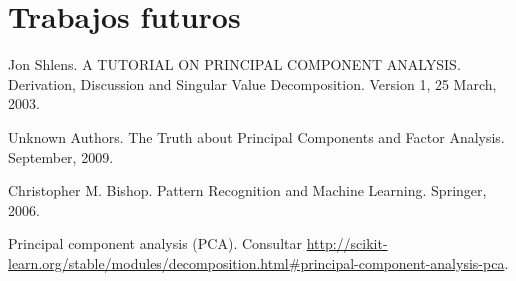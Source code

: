 \documentclass[11pt,spanish,listoffigures,listoftables]{tfgetsinf}
\begin{document}
\chapter{Trabajos futuros}

\begin{thebibliography}{10}

   Jon Shlens.
   \newblock A TUTORIAL ON PRINCIPAL COMPONENT ANALYSIS. Derivation, Discussion and Singular Value Decomposition.
   \newblock Version 1, 25 March, 2003.

   Unknown Authors.
   \newblock The Truth about Principal Components and Factor Analysis.
    September, 2009.
   
   Christopher M. Bishop.
   \newblock Pattern Recognition and Machine Learning.
   \newblock Springer, 2006.

   Principal component analysis (PCA). 
   \newblock Consultar 
   \url{http://scikit-learn.org/stable/modules/decomposition.html#principal-component-analysis-pca}.

\end{thebibliography}
\cleardoublepage

%
\end{document}
